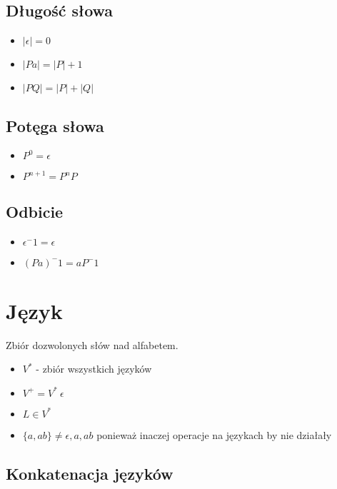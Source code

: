 \documentclass{../notatki}
\begin{document}
\subsection{Długość słowa}

\begin{itemize}
    \item $|\epsilon| = 0$
    \item $|Pa| = |P| + 1$
    \item $|PQ| = |P| + |Q|$
\end{itemize}

\subsection{Potęga słowa}

\begin{itemize}
    \item $P^0 = \epsilon$
    \item $P^{n + 1} = P^nP$
\end{itemize}

\subsection{Odbicie}

\begin{itemize}
    \item $\epsilon^-1 = \epsilon$
    \item $(Pa)^-1 = aP^-1$
\end{itemize}

\section{Język}

Zbiór dozwolonych słów nad alfabetem.

\begin{itemize}
    \item $V^*$ - zbiór wszystkich języków
    \item $V^+ = V^* \ {\epsilon}$
    \item $L \in V^*$
    \item $\{a, ab\} \ne {\epsilon, a, ab}$ ponieważ inaczej operacje na językach by nie działały
\end{itemize}

\subsection{Konkatenacja języków}
\end{document}
